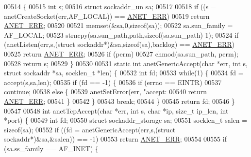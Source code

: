 \begin{DoxyCode}
{{{{{{{{{{{{{{{{{{{{{{{{{00514 \{
00515     \textcolor{keywordtype}{int} s;
00516     \textcolor{keyword}{struct} sockaddr\_un sa;
00517 
00518     \textcolor{keywordflow}{if} ((s = anetCreateSocket(err,AF\_LOCAL)) == \hyperlink{anet_8h_a0697b7774a7e0f4ef141839fe93536fe}{ANET\_ERR})
00519         \textcolor{keywordflow}{return} \hyperlink{anet_8h_a0697b7774a7e0f4ef141839fe93536fe}{ANET\_ERR};
00520 
00521     memset(&sa,0,\textcolor{keyword}{sizeof}(sa));
00522     sa.sun\_family = AF\_LOCAL;
00523     strncpy(sa.sun\_path,path,\textcolor{keyword}{sizeof}(sa.sun\_path)-1);
00524     \textcolor{keywordflow}{if} (anetListen(err,s,(\textcolor{keyword}{struct} sockaddr*)&sa,\textcolor{keyword}{sizeof}(sa),backlog) == 
      \hyperlink{anet_8h_a0697b7774a7e0f4ef141839fe93536fe}{ANET\_ERR})
00525         \textcolor{keywordflow}{return} \hyperlink{anet_8h_a0697b7774a7e0f4ef141839fe93536fe}{ANET\_ERR};
00526     \textcolor{keywordflow}{if} (perm)
00527         chmod(sa.sun\_path, perm);
00528     \textcolor{keywordflow}{return} s;
00529 \}
00530 
00531 \textcolor{keyword}{static} \textcolor{keywordtype}{int} anetGenericAccept(\textcolor{keywordtype}{char} *err, \textcolor{keywordtype}{int} s, \textcolor{keyword}{struct} sockaddr *sa, socklen\_t *len) \{
00532     \textcolor{keywordtype}{int} fd;
00533     \textcolor{keywordflow}{while}(1) \{
00534         fd = accept(s,sa,len);
00535         \textcolor{keywordflow}{if} (fd == -1) \{
00536             \textcolor{keywordflow}{if} (errno == EINTR)
00537                 \textcolor{keywordflow}{continue};
00538             \textcolor{keywordflow}{else} \{
00539                 anetSetError(err, \textcolor{stringliteral}{"accept: %
00540                 \textcolor{keywordflow}{return} \hyperlink{anet_8h_a0697b7774a7e0f4ef141839fe93536fe}{ANET\_ERR};
00541             \}
00542         \}
00543         \textcolor{keywordflow}{break};
00544     \}
00545     \textcolor{keywordflow}{return} fd;
00546 \}
00547 
00548 \textcolor{keywordtype}{int} anetTcpAccept(\textcolor{keywordtype}{char} *err, \textcolor{keywordtype}{int} s, \textcolor{keywordtype}{char} *ip, size\_t ip\_len, \textcolor{keywordtype}{int} *port) \{
00549     \textcolor{keywordtype}{int} fd;
00550     \textcolor{keyword}{struct} sockaddr\_storage sa;
00551     socklen\_t salen = \textcolor{keyword}{sizeof}(sa);
00552     \textcolor{keywordflow}{if} ((fd = anetGenericAccept(err,s,(\textcolor{keyword}{struct} sockaddr*)&sa,&salen)) == -1)
00553         \textcolor{keywordflow}{return} \hyperlink{anet_8h_a0697b7774a7e0f4ef141839fe93536fe}{ANET\_ERR};
00554 
00555     \textcolor{keywordflow}{if} (sa.ss\_family == AF\_INET) \{
}}}}}}}}}}}}}}}}}}}}}}}}}}
\end{DoxyCode}
